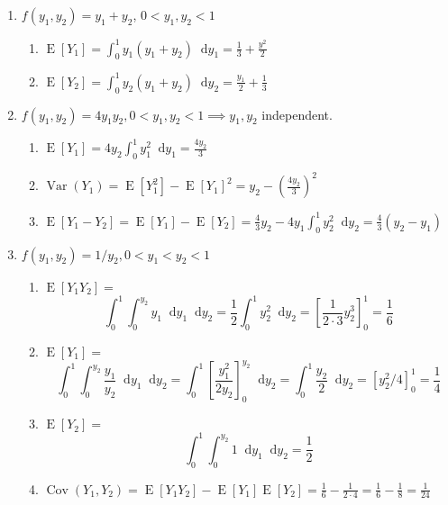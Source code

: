 \documentclass{article}
\title{\MakeUppercase{\jobname}}
\author{Justin Nguyen}
\date{\today}
\newcommand{\var}[1]{\operatorname{Var}(#1)}
\newcommand{\cov}[1]{\operatorname{Cov}(#1)}
\newcommand{\expt}[1]{\operatorname{E}[#1]}
\newcommand*\diff{\mathop{}\!\mathrm{d}}
\newcommand{\intv}[4]{\int_{#3}^{#4} #1 \diff #2}
\begin{document}
\maketitle


\begin{enumerate}
  \item $f(y_1, y_2) = y_1 + y_2$, $0 < y_1, y_2 < 1$
  \begin{enumerate}
    \item $\expt{Y_1} = \intv{ y_1(y_1+y_2) }{y_1}{0}{1} = \frac{1}{3} + \frac{y^2}{2}$
    \item $\expt{Y_2} = \intv{ y_2(y_1+y_2) }{y_2}{0}{1} = \frac{y_1}{2} + \frac{1}{3}$
  \end{enumerate}

  \item $f(y_1, y_2) = 4y_1y_2, 0 < y_1, y_2 < 1 \implies y_1, y_2$ independent.
  \begin{enumerate}
    \item $\expt{Y_1} = 4y_2\intv{y_1^2}{y_1}{0}{1} = \frac{4y_2}{3}$
    \item $\var{Y_1} = \expt{Y_1^2} - {\expt{Y_1}}^2 = y_2 - \left(\frac{4y_2}{3}\right)^2$
    \item $\expt{Y_1 - Y_2} = \expt{Y_1} - \expt{Y_2} = 
    \frac{4}{3}y_2 - 4y_1\intv{y_2^2}{y_2}{0}{1} = \frac{4}{3}(y_2-y_1)$
  \end{enumerate}

  \item $f(y_1, y_2) = 1/y_2, 0 < y_1 < y_2 < 1$ \begin{enumerate}
    \item $\expt{Y_1Y_2} = $ \[
      \intv{ \intv{ y_1 }{y_1}{0}{y_2} }{y_2}{0}{1}
      = \frac{1}{2}\intv{ y_2^2 }{y_2}{0}{1}
      = \left[\frac{1}{2\cdot 3}y_2^3\right]_{0}^{1}
      = \frac{1}{6}
    \]
    \item $\expt{Y_1} = $ \[
      \intv{ \intv{ \frac{y_1}{y_2} }{y_1}{0}{y_2} }{y_2}{0}{1}
      = \intv{ \left[\frac{y_1^2}{2y_2}\right]_{0}^{y_2} }{y_2}{0}{1}
      = \intv{ \frac{y_2}{2} }{y_2}{0}{1}
      = \left[ y_2^2/4 \right]_{0}^{1} = \frac{1}{4}
    \]
    \item $\expt{Y_2} = $ \[
      \intv{ \intv{ 1 }{y_1}{0}{y_2} }{y_2}{0}{1}
      = \frac{1}{2}
    \]
    \item $\cov{Y_1, Y_2} = \expt{Y_1Y_2} - \expt{Y_1}\expt{Y_2} 
    = \frac{1}{6} - \frac{1}{2\cdot 4} = \frac{1}{6} - \frac{1}{8} = \frac{1}{24}$
  \end{enumerate}


\end{enumerate}
\end{document}

